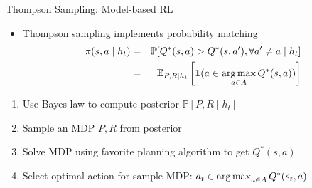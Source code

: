 \documentclass[aspectratio=169]{../latex_main/tntbeamer}  %
\begin{document}
\begin{frame}[c]{Thompson Sampling: Model-based RL}
	
	\begin{itemize}
		\item Thompson sampling implements probability matching
	\begin{eqnarray}
	\pi(s, a \mid h_t) &=& \mathbb{P} [Q^*(s,a) > Q^*(s,a'), \forall a' \neq a \mid h_t]\nonumber \\
	&=& \mathbb{E}_{P, R \mid h_t} \left[\mathbf{1}(a \in \operatorname*{arg\,max}_{a \in A} Q^*(s,a))\right]		\nonumber
	\end{eqnarray}
	\end{itemize}
	
	\begin{enumerate}		
		\item Use Bayes law to compute posterior $ \mathbb{P}[P, R \mid h_t]$
		\item Sample an MDP $P, R$ from posterior
		\item Solve MDP using favorite planning algorithm to get $Q^*(s,a)$
		\item Select optimal action for sample MDP: $a_t \in \operatorname*{arg\,max}_{a \in A}Q^*(s_t,a)$
	\end{enumerate}
	
\end{frame}

\end{document}
